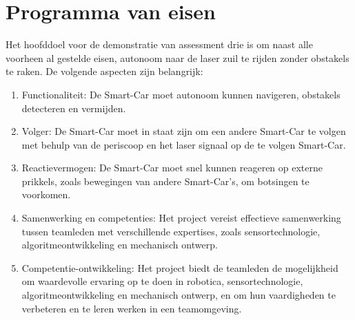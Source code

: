 \section{Programma van eisen}

Het hoofddoel voor de demonstratie van assessment drie is om naast alle voorheen al gestelde eisen, autonoom naar de laser zuil te rijden zonder obstakels te raken. De volgende aspecten zijn belangrijk:
\begin{enumerate}
    \item Functionaliteit: De \gls{Smart-Car} moet autonoom kunnen navigeren, obstakels detecteren en vermijden.
    \item Volger: De \gls{Smart-Car} moet in staat zijn om een andere \gls{Smart-Car} te volgen met behulp van de periscoop en het laser signaal op de te volgen \gls{Smart-Car}.
    \item Reactievermogen: De \gls{Smart-Car} moet snel kunnen reageren op externe prikkels, zoals bewegingen van andere \gls{Smart-Car}'s, om botsingen te voorkomen.
    \item Samenwerking en competenties: Het project vereist effectieve samenwerking tussen teamleden met verschillende expertises, zoals sensortechnologie, algoritmeontwikkeling en mechanisch ontwerp.
    \item Competentie-ontwikkeling: Het project biedt de teamleden de mogelijkheid om waardevolle ervaring op te doen in robotica, sensortechnologie, algoritmeontwikkeling en mechanisch ontwerp, en om hun vaardigheden te verbeteren en te leren werken in een teamomgeving.
\end{enumerate}
